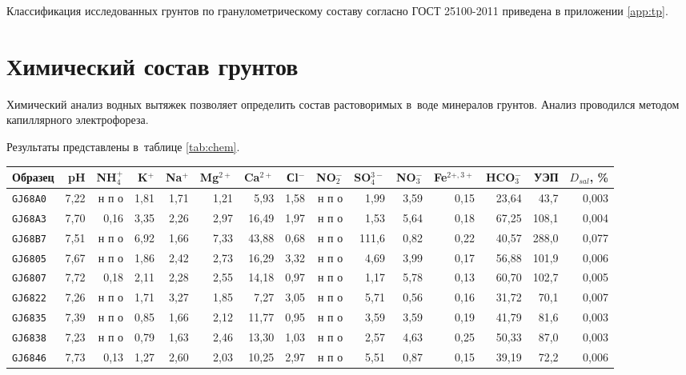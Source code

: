 Классификация исследованных грунтов по гранулометрическому составу согласно ГОСТ 25100-2011 \cite{gost25100} приведена в приложении \ref{app:tp}.

 
\section{Химический состав грунтов}

Химический анализ водных вытяжек позволяет определить состав растоворимых в~воде минералов грунтов.
Анализ проводился методом капиллярного электрофореза. 

Результаты представлены в~таблице \ref{tab:chem}.

\begin{sidewaystable}[p]
    \centering
    \small
    \caption{Химических состав водных вытяжек грунтов и их удельная электропроводимость} \label{tab:chem}
    \begin{tabular}{@{}lrrrrrrrrrrrrrr@{}}
    \toprule
    Образец & pH & NH$_4^+$ &	K$^+$ & Na$^+$ & Mg$^{2+}$ & Ca$^{2+}$ &	Сl$^-$ &	NO$_2^-$	   & SO$_4^{3-}$ &	NO$_3^-$ &	Fe$^{2+,3+}$ &	HCO$_3^-$   & УЭП & $D_{sal}$, \% \\ \midrule
    \texttt{GJ68A0} & 7,22 & н п о & 1,81 & 1,71 & 1,21 &  5,93 & 1,58 & н п о &  1,99 & 3,59 & 0,15 & 23,64 & 43,7  & 0,003 \\
    \texttt{GJ68A3} & 7,70 &  0,16 & 3,35 & 2,26 & 2,97 & 16,49 & 1,97 & н п о &  1,53 & 5,64 & 0,18 & 67,25 & 108,1 & 0,004 \\
    \texttt{GJ68B7} & 7,51 & н п о & 6,92 & 1,66 & 7,33 & 43,88 & 0,68 & н п о & 111,6 & 0,82 & 0,22 & 40,57 & 288,0 & 0,077 \\
    \texttt{GJ6805} & 7,67 & н п о & 1,86 & 2,42 & 2,73 & 16,29 & 3,32 & н п о &  4,69 & 3,99 & 0,17 & 56,88 & 101,9 & 0,006 \\
    \texttt{GJ6807} & 7,72 &  0,18 & 2,11 & 2,28 & 2,55 & 14,18 & 0,97 & н п о &  1,17 & 5,78 & 0,13 & 60,70 & 102,7 & 0,005 \\
    \texttt{GJ6822} & 7,26 & н п о & 1,71 & 3,27 & 1,85 &  7,27 & 3,05 & н п о &  5,71 & 0,56 & 0,16 & 31,72 & 70,1  & 0,007 \\
    \texttt{GJ6835} & 7,39 & н п о & 0,85 & 1,66 & 2,12 & 11,77 & 0,95 & н п о &  3,59 & 3,59 & 0,19 & 41,79 & 81,6  & 0,003 \\
    \texttt{GJ6838} & 7,23 & н п о & 0,79 & 1,63 & 2,46 & 13,30 & 1,03 & н п о &  2,57 & 4,63 & 0,25 & 50,33 & 87,0  & 0,003 \\
    \texttt{GJ6846} & 7,73 &  0,13 & 1,27 & 2,60 & 2,03 & 10,25 & 2,97 & н п о &  5,51 & 0,87 & 0,15 & 39,19 & 72,2  & 0,006 \\

\end{tabular}
\end{sidewaystable}
